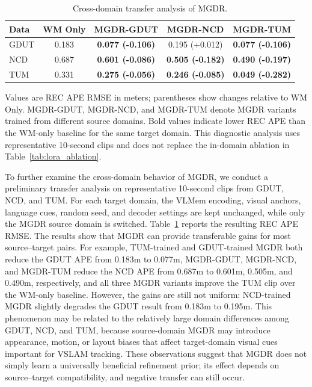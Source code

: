 \documentclass[journal]{IEEEtran}
\begin{document}
\begin{table}[!t]
\caption{Cross-domain transfer analysis of MGDR.}
\label{tab:mgdr_cross_domain}
\centering
\begingroup
\renewcommand{\arraystretch}{1.14}
\footnotesize
\begin{tabular*}{\columnwidth}{@{\extracolsep{\fill}}lcccc@{}}
\toprule
Data & WM Only & MGDR-GDUT & MGDR-NCD & MGDR-TUM \\
\midrule
GDUT & 0.183 & \textbf{0.077 {\scriptsize(-0.106)}} & 0.195 {\scriptsize(+0.012)} & \textbf{0.077 {\scriptsize(-0.106)}} \\
NCD & 0.687 & \textbf{0.601 {\scriptsize(-0.086)}} & \textbf{0.505 {\scriptsize(-0.182)}} & \textbf{0.490 {\scriptsize(-0.197)}} \\
TUM & 0.331 & \textbf{0.275 {\scriptsize(-0.056)}} & \textbf{0.246 {\scriptsize(-0.085)}} & \textbf{0.049 {\scriptsize(-0.282)}} \\
\bottomrule
\end{tabular*}
\endgroup

\vspace{1mm}
\begin{minipage}{\columnwidth}
\footnotesize
Values are REC APE RMSE in meters; parentheses show changes relative to WM Only. MGDR-GDUT, MGDR-NCD, and MGDR-TUM denote MGDR variants trained from different source domains. Bold values indicate lower REC APE than the WM-only baseline for the same target domain. This diagnostic analysis uses representative 10-second clips and does not replace the in-domain ablation in Table~\ref{tab:lora_ablation}.
\end{minipage}
\end{table}

To further examine the cross-domain behavior of MGDR, we conduct a preliminary transfer analysis on representative 10-second clips from GDUT, NCD, and TUM. For each target domain, the VLMem encoding, visual anchors, language cues, random seed, and decoder settings are kept unchanged, while only the MGDR source domain is switched. Table~\ref{tab:mgdr_cross_domain} reports the resulting REC APE RMSE. The results show that MGDR can provide transferable gains for most source--target pairs. For example, TUM-trained and GDUT-trained MGDR both reduce the GDUT APE from 0.183m to 0.077m, MGDR-GDUT, MGDR-NCD, and MGDR-TUM reduce the NCD APE from 0.687m to 0.601m, 0.505m, and 0.490m, respectively, and all three MGDR variants improve the TUM clip over the WM-only baseline. However, the gains are still not uniform: NCD-trained MGDR slightly degrades the GDUT result from 0.183m to 0.195m. This phenomenon may be related to the relatively large domain differences among GDUT, NCD, and TUM, because source-domain MGDR may introduce appearance, motion, or layout biases that affect target-domain visual cues important for VSLAM tracking. These observations suggest that MGDR does not simply learn a universally beneficial refinement prior; its effect depends on source--target compatibility, and negative transfer can still occur.
\end{document}
